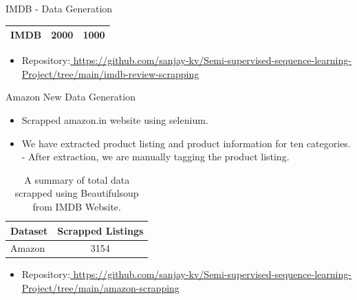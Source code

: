 \documentclass[aspectratio=169,xcolor=dvipsnames]{beamer}
\begin{document}
\begin{frame}{IMDB - Data Generation}
\begin{table}[h!]
\begin{center}
\begin{tabular}{|l|c|r|}
      \hline
      IMDB & 2000 & 1000 \\
      \hline
     
    \end{tabular}
  \end{center}
\end{table}   \newline
\begin{itemize}
      
    \item \alert{Repository:}\href{ https://github.com/sanjay-kv/Semi-supervised-sequence-learning-Project/tree/main/imdb_review_scrapping}{ https://github.com/sanjay-kv/Semi-supervised-sequence-learning-Project/tree/main/imdb-review-scrapping}
 
    \end{itemize}
\end{frame}


\begin{frame}{Amazon New Data Generation}
    \begin{itemize}
        \item Scrapped amazon.in website using selenium.
        \item We have extracted product listing and product information for ten categories. \break 
            - After extraction, we are manually tagging the product listing. \break
    \end{itemize}
    
          \begin{table}[h!]
  \begin{center}
    \caption{A summary of total data scrapped using Beautifulsoup from IMDB Website.}
    \label{tab:table1}
    \begin{tabular}{|l|c|} %
      \hline
      \textbf{Dataset } & \textbf{Scrapped Listings} \\
      
      \hline
      Amazon & 3154  \\
      \hline
     
    \end{tabular}
  \end{center}
\end{table}
\begin{itemize}
      
    \item \alert{Repository:}\href{ https://github.com/sanjay-kv/Semi-supervised-sequence-learning-Project/tree/main/amazon_scrapping}{ https://github.com/sanjay-kv/Semi-supervised-sequence-learning-Project/tree/main/amazon-scrapping}
 
    \end{itemize}
\end{frame}
\end{document}
